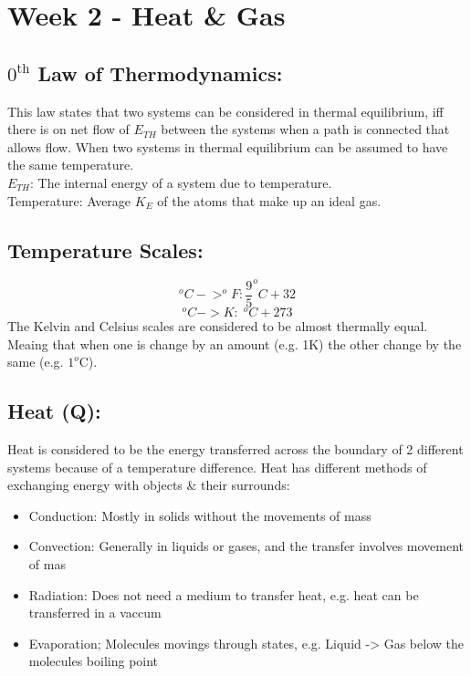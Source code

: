 \documentclass[a5paper]{report}
\begin{document}
	\section*{Week 2 - Heat \& Gas}
	\subsection*{$0^{\text{th}}$ Law of Thermodynamics:}
	This law states that two systems can be considered in thermal equilibrium, iff there is on net flow of $E_{TH}$ between the systems when a path is connected that allows flow. When two systems in thermal equilibrium can be assumed to have the same temperature.\\
	$E_{TH}$: The internal energy of a system due to temperature.\\
	Temperature: Average $K_{E}$ of the atoms that make up an ideal gas.

	\subsection*{Temperature Scales:}
	$$^{o}C->^{o}F:\frac{9}{5}^{o}C+32$$
	$$^{o}C->K:\;^{o}C+273$$
	The Kelvin and Celsius scales are considered to be almost thermally equal. Meaing that when one is change by an amount (e.g. 1K) the other change by the same (e.g. $1^{o}$C).

	\subsection*{Heat (Q):}
	Heat is considered to be the energy transferred across the boundary of 2 different systems because of a temperature difference. Heat has different methods of exchanging energy with objects \& their surrounds:
	\begin{itemize}
		\item Conduction: Mostly in solids without the movements of mass
		\item Convection: Generally in liquids or gases, and the transfer involves movement of mas
		\item Radiation: Does not need a medium to transfer heat, e.g. heat can be transferred in a vaccum
		\item Evaporation; Molecules movings through states, e.g. Liquid -> Gas below the molecules boiling point
	\end{itemize}
\end{document}
